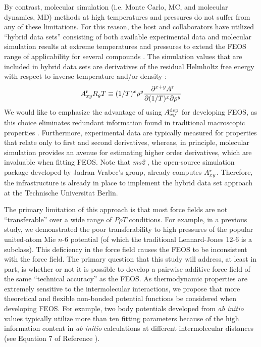 \documentclass[11pt,a4paper]{article}
\begin{document}
By contrast, molecular simulation (i.e. Monte Carlo, MC, and molecular dynamics, MD) methods at high temperatures and pressures do not suffer from any of these limitations. For this reason, the host and collaborators have utilized ``hybrid data sets'' consisting of both available experimental data and molecular simulation results at extreme temperatures and pressures to extend the FEOS range of applicability for several compounds \cite{Thol2016_siloxane_first,Thol2016_siloxane,Thol2017,Rutkai2013,Thol2015}. The simulation values that are included in hybrid data sets are derivatives of the residual Helmholtz free energy with respect to inverse temperature and/or density :
\begin{equation} \label{Residual Derivatives}
A_{xy}^{\rm r} R_gT \equiv (1/T)^x\rho^y \frac{\partial^{x+y}A^{\rm r}}{\partial(1/T)^x \partial \rho^y}
\end{equation}
We would like to emphasize the advantage of using $A_{xy}^{\rm dep}$ for developing FEOS, as this choice eliminates redundant information found in traditional macroscopic properties \cite{Thol2016_LJ,Thol_LJTS,Rutkai2017,Lustig2015,Rutkai2013,Rutkai2015}. Furthermore, experimental data are typically measured for properties that relate only to first and second derivatives, whereas, in principle, molecular simulation provides an avenue for estimating higher order derivatives, which are invaluable when fitting FEOS. Note that \textit{ms2} \cite{ms2}, the open-source simulation package developed by Jadran Vrabec's group, already computes $A_{xy}^{\rm r}$. Therefore, the infrastructure is already in place to implement the hybrid data set approach at the Technische Universitat Berlin.
 

The primary limitation of this approach is that most force fields are not ``transferable'' over a wide range of $P \rho T$ conditions. For example, in a previous study, we demonstrated the poor transferability to high pressures of the popular united-atom Mie $n$-6 potential (of which the traditional Lennard-Jones 12-6 is a subclass). This deficiency in the force field causes the FEOS to be inconsistent with the force field. The primary question that this study will address, at least in part, is whether or not it is possible to develop a pairwise additive force field of the same ``technical accuracy'' as the FEOS. As thermodynamic properties are extremely sensitive to the intermolecular interactions, we propose that more theoretical and flexible non-bonded potential functions be considered when developing FEOS. For example, two body potentials developed from \textit{ab initio} values typically utilize more than ten fitting parameters because of the high information content in \textit{ab initio} calculations at different intermolecular distances (see Equation 7 of Reference \cite{Przybytek2017}).
\end{document}
